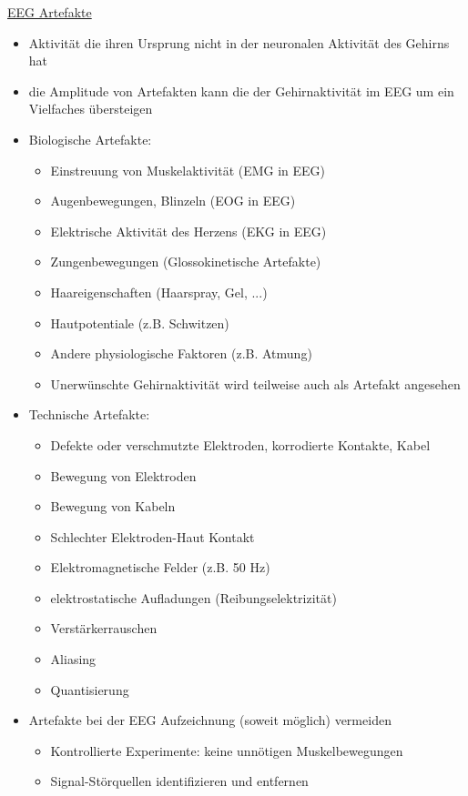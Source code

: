 \documentclass[a4paper,10pt,oneside]{article}
\begin{document}
\underline{EEG Artefakte} \\
	\begin{itemize}
		\item Aktivität die ihren Ursprung nicht in der neuronalen Aktivität des Gehirns hat 
		\item die Amplitude von Artefakten kann die der Gehirnaktivität im EEG um ein Vielfaches übersteigen
		\item Biologische Artefakte:
			\begin{itemize}
				\item Einstreuung von Muskelaktivität (EMG in EEG)
				\item Augenbewegungen, Blinzeln (EOG in EEG)
				\item Elektrische Aktivität des Herzens (EKG in EEG)
				\item Zungenbewegungen (Glossokinetische Artefakte)
				\item Haareigenschaften (Haarspray, Gel, ...)
				\item Hautpotentiale (z.B. Schwitzen)
				\item Andere physiologische Faktoren (z.B. Atmung)
				\item Unerwünschte Gehirnaktivität wird teilweise auch als Artefakt angesehen
			\end{itemize}
		\item Technische Artefakte:
			\begin{itemize}
				\item Defekte oder verschmutzte Elektroden, korrodierte Kontakte, Kabel
				\item Bewegung von Elektroden
				\item Bewegung von Kabeln
				\item Schlechter Elektroden-Haut Kontakt
				\item Elektromagnetische Felder (z.B. 50 Hz)
				\item elektrostatische Aufladungen (Reibungselektrizität)
				\item Verstärkerrauschen
				\item Aliasing
				\item Quantisierung
			\end{itemize}
		\item Artefakte bei der EEG Aufzeichnung (soweit möglich) vermeiden
			\begin{itemize}
				\item Kontrollierte Experimente: keine unnötigen Muskelbewegungen
				\item Signal-Störquellen identifizieren und entfernen
			\end{itemize}
	\end{itemize}
	
\end{document}
